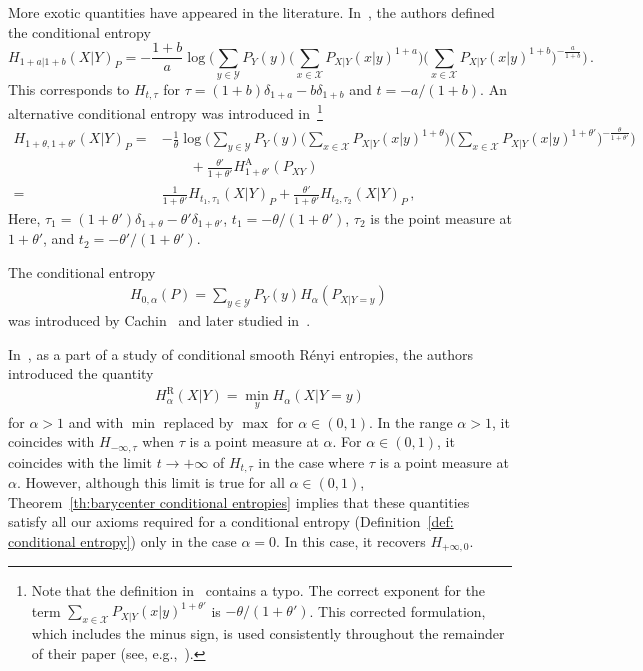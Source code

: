 \documentclass[aps,pra,11pt,onecolumn,nofootinbib,tightenlines]{revtex4-2}
\theoremstyle{definition}
\newcommand{\X}{\mathcal{X}}
\newcommand{\Y}{\mathcal{Y}}
\newcommand{\mc}[1]{\mathcal{#1}}
\begin{document}
More exotic quantities have appeared in the literature. In~\cite{tan2018conditional}, the authors defined the conditional entropy
\begin{equation}
    H_{1+a|1+b}(X|Y)_P=-\frac{1+b}{a}\log{\bigg(\sum_{y \in \Y} P_Y(y)\Big(\sum_{x \in \X} P_{X|Y}(x|y)^{1+a}\Big)\Big(\sum_{x \in \X} P_{X|Y}(x|y)^{1+b}\Big)^{-\frac{a}{1+b}}\bigg)} \,.
\end{equation}
This corresponds to $H_{t,\tau}$ for $\tau=(1+b)\delta_{1+a}-b\delta_{1+b}$ and $t=-a/(1+b)$.
An alternative conditional entropy was introduced in~\cite{hayashi2016uniform}\footnote{Note that the definition in~\cite[Equation (14)]{hayashi2016uniform} contains a typo. The correct exponent for the term $\sum_{x \in \X} P_{X|Y}(x|y)^{1+\theta'}$ is $-\theta/(1+\theta')$. This corrected formulation, which includes the minus sign, is used consistently throughout the remainder of their paper (see, e.g.,~\cite[Lemma 3, Property (11)]{hayashi2016uniform}).}
\begin{align}
    H_{1+\theta,1+\theta'}(X|Y)_P=&-\frac{1}{\theta}\log{\bigg(\sum_{y \in \Y} P_Y(y)\Big(\sum_{x \in \X} P_{X|Y}(x|y)^{1+\theta}\Big)\Big(\sum_{x \in \X} P_{X|Y}(x|y)^{1+\theta'}\Big)^{-\frac{\theta}{1+\theta'}}\bigg)} \\
    &\qquad + \frac{\theta'}{1+\theta'}H^{\text{A}}_{1+\theta'}(P_{XY}) \\
    =&\frac{1}{1+\theta'}H_{t_1,\tau_1}(X|Y)_P+\frac{\theta'}{1+\theta'}H_{t_2,\tau_2}(X|Y)_P\,,
\end{align}
Here, $\tau_1=(1+\theta')\delta_{1+\theta}-\theta'\delta_{1+\theta'}$, $t_1=-\theta/(1+\theta')$, $\tau_2$ is the point measure at $1+\theta'$, and $t_2=-\theta'/(1+\theta')$.

The conditional entropy
 \begin{align}
H_{0,\alpha}(P)=\sum_{y\in\mc Y} P_Y(y)H_\alpha(P_{X|Y=y})\,
 \end{align}
 was introduced by Cachin~\cite{cachin1997entropy} and later studied in~\cite{teixeira2012conditional}.

In~\cite{renner2005simple},
as a part of a study of conditional smooth R\'enyi entropies, the authors introduced the quantity
\begin{align}
    H^{\text{R}}_\alpha(X|Y) = \min _{y} H_\alpha(X|Y=y)
\end{align}
for $\alpha > 1$ and with $\min$ replaced by $\max$ for $\alpha \in (0,1)$. In the range $\alpha>1$, it coincides with $H_{-\infty,\tau}$ when $\tau$ is a point measure at $\alpha$.
For $\alpha \in (0,1)$, it coincides with the limit $t\rightarrow +\infty$ of $H_{t,\tau}$ in the case where $\tau$ is a point measure at $\alpha$. However, although this limit is true for all $\alpha \in (0,1)$, Theorem~\ref{th:barycenter conditional entropies} implies that these quantities satisfy all our axioms required for a conditional entropy  (Definition~\ref{def: conditional entropy}) only in the case $\alpha = 0$.
In this case, it recovers \(H_{+\infty,0}\).  
\end{document}
